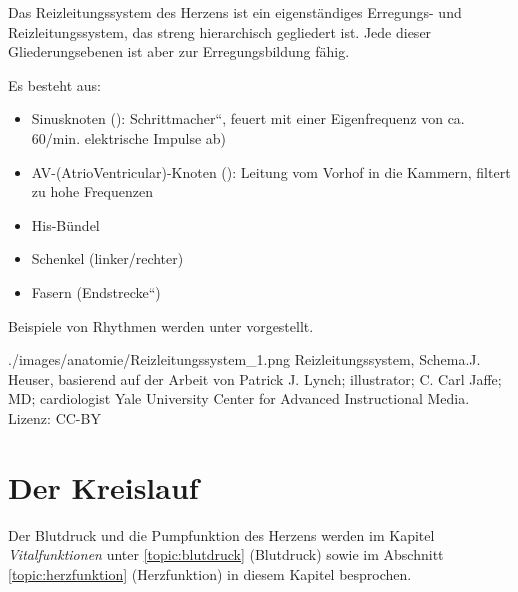 {
Das Reizleitungssystem des Herzens ist ein eigenständiges  Erregungs- und 
Reizleitungssystem, das streng hierarchisch gegliedert ist. Jede dieser
Gliederungsebenen ist aber zur Erregungsbildung  fähig.

Es besteht aus:

\begin{itemize}
\item Sinusknoten   
({}):  
{\quotedblbase}Schrittmacher{\textquotedblleft}, feuert mit einer
Eigenfrequenz von ca. 60/min. elektrische Impulse ab)
\item AV-(AtrioVentricular)-Knoten ({}): Leitung
vom Vorhof in die Kammern, filtert zu hohe Frequenzen
\item His-Bündel  
\item {}Schenkel (linker/rechter)
\item {}Fasern
({\quotedblbase}Endstrecke{\textquotedblleft})
\end{itemize}


Beispiele von Rhythmen werden unter 
vorgestellt. 

}{}{./images/anatomie/Reizleitungssystem_1.png}{
Reizleitungssystem, Schema.}{J. Heuser,
basierend auf der Arbeit von Patrick J. Lynch; illustrator;
C. Carl Jaffe; MD; cardiologist Yale University Center for
Advanced Instructional Media. Lizenz: CC-BY}








\section{Der Kreislauf }
\label{topic:blutkreislauf} 


Der Blutdruck und die Pumpfunktion des Herzens werden im
Kapitel \emph{Vitalfunktionen} unter \ref{topic:blutdruck}
(Blutdruck) sowie im Abschnitt \ref{topic:herzfunktion}
(Herzfunktion) in diesem Kapitel besprochen.


